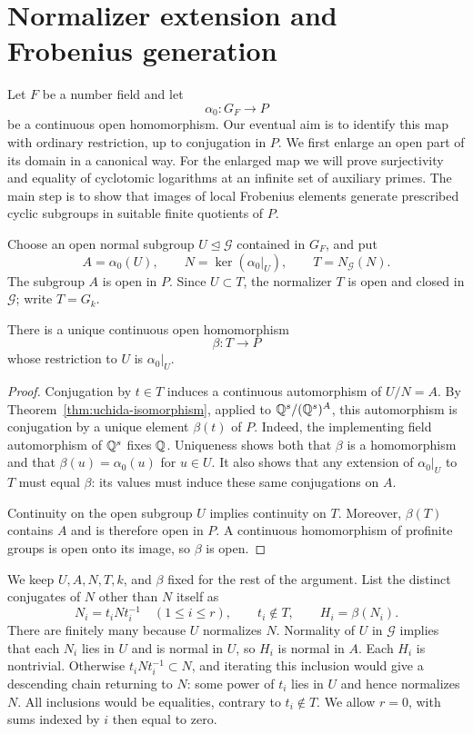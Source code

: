 \section{Normalizer extension and Frobenius generation}\label{sec:generation}

Let $F$ be a number field and let
\[
  \alpha_0:G_F\longrightarrow P
\]
be a continuous open homomorphism. Our eventual aim is to identify this
map with ordinary restriction, up to conjugation in $P$. We first enlarge
an open part of its domain in a canonical way. For the enlarged map we
will prove surjectivity and equality of cyclotomic logarithms at an
infinite set of auxiliary primes. The main step is to show that images
of local Frobenius elements generate prescribed cyclic subgroups in
suitable finite quotients of $P$.

Choose an open normal subgroup $U\trianglelefteq\mathcal G$ contained in
$G_F$, and put
\[
 A=\alpha_0(U),\qquad N=\ker(\alpha_0|_U),\qquad
 T=N_{\mathcal G}(N).
\]
The subgroup $A$ is open in $P$. Since $U\subset T$, the normalizer $T$
is open and closed in $\mathcal G$; write $T=G_k$.

\begin{lemma}\label{lem:normalizer-extension}
There is a unique continuous open homomorphism
\[
  \beta:T\longrightarrow P
\]
whose restriction to $U$ is $\alpha_0|_U$.
\end{lemma}

\begin{proof}
Conjugation by $t\in T$ induces a continuous automorphism of $U/N=A$.
By Theorem~\ref{thm:uchida-isomorphism}, applied to
$\mathbb Q^s/(\mathbb Q^s)^A$, this automorphism is conjugation by a unique element
$\beta(t)$ of $P$. Indeed, the implementing field automorphism of
$\mathbb Q^s$ fixes $\mathbb Q$. Uniqueness shows both that $\beta$ is a homomorphism
and that $\beta(u)=\alpha_0(u)$ for $u\in U$. It also shows that any
extension of $\alpha_0|_U$ to $T$ must equal $\beta$: its values must
induce these same conjugations on $A$.

Continuity on the open subgroup $U$ implies continuity on $T$.
Moreover, $\beta(T)$ contains $A$ and is therefore open in $P$.
A continuous homomorphism of profinite groups is open onto its image,
so $\beta$ is open.
\end{proof}

We keep $U,A,N,T,k$, and $\beta$ fixed for the rest of the argument.
List the distinct conjugates of $N$ other than $N$ itself as
\[
 N_i=t_iNt_i^{-1}\quad(1\leq i\leq r),\qquad t_i\notin T,
 \qquad H_i=\beta(N_i).
\]
There are finitely many because $U$ normalizes $N$. Normality of $U$
in $\mathcal G$ implies that each $N_i$ lies in $U$ and is normal in
$U$, so $H_i$ is normal in $A$.
Each $H_i$ is nontrivial. Otherwise $t_iNt_i^{-1}\subset N$, and
iterating this inclusion would give a descending chain returning to
$N$: some power of $t_i$ lies in $U$ and hence normalizes $N$.
All inclusions would be equalities, contrary to $t_i\notin T$.
We allow $r=0$, with sums indexed by $i$ then equal to zero.

